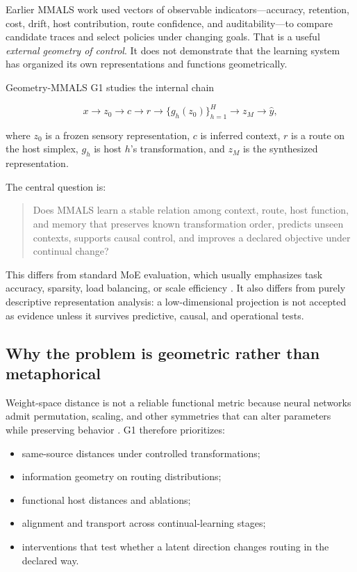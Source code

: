 \documentclass[11pt,a4paper]{article}
\begin{document}
Earlier MMALS work used vectors of observable indicators---accuracy, retention, cost, drift, host contribution, route confidence, and auditability---to compare candidate traces and select policies under changing goals. That is a useful \emph{external geometry of control}. It does not demonstrate that the learning system has organized its own representations and functions geometrically.

Geometry-MMALS G1 studies the internal chain

\begin{equation}
 x \longrightarrow z_0 \longrightarrow c \longrightarrow r
 \longrightarrow \{g_h(z_0)\}_{h=1}^{H}
 \longrightarrow z_M \longrightarrow \hat y,
\end{equation}

where $z_0$ is a frozen sensory representation, $c$ is inferred context, $r$ is a route on the host simplex, $g_h$ is host $h$'s transformation, and $z_M$ is the synthesized representation.

The central question is:

\begin{quote}
Does MMALS learn a stable relation among context, route, host function, and memory that preserves known transformation order, predicts unseen contexts, supports causal control, and improves a declared objective under continual change?
\end{quote}

This differs from standard MoE evaluation, which usually emphasizes task accuracy, sparsity, load balancing, or scale efficiency \citep{shazeer2017moe,fedus2022switch}. It also differs from purely descriptive representation analysis: a low-dimensional projection is not accepted as evidence unless it survives predictive, causal, and operational tests.

\subsection{Why the problem is geometric rather than metaphorical}

Weight-space distance is not a reliable functional metric because neural networks admit permutation, scaling, and other symmetries that can alter parameters while preserving behavior \citep{dinh2017sharp}. G1 therefore prioritizes:

\begin{itemize}
\item same-source distances under controlled transformations;
\item information geometry on routing distributions;
\item functional host distances and ablations;
\item alignment and transport across continual-learning stages;
\item interventions that test whether a latent direction changes routing in the declared way.
\end{itemize}
\end{document}
